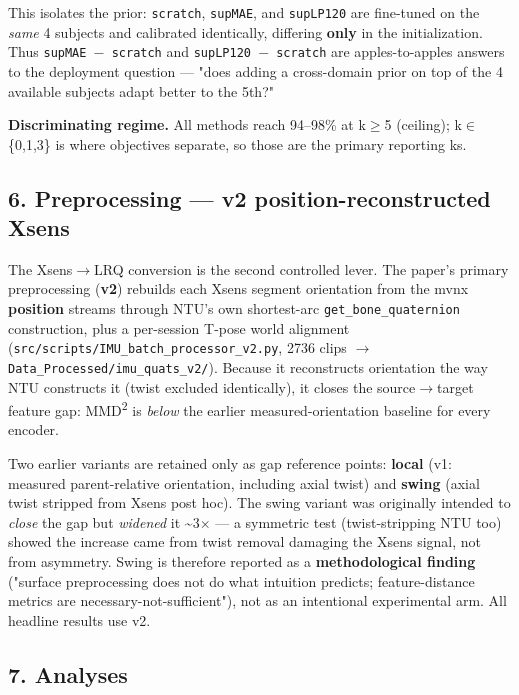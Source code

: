 This isolates the prior: \texttt{scratch}, \texttt{supMAE}, and \texttt{supLP120} are fine-tuned on the \textit{same} 4 subjects and calibrated identically, differing \textbf{only} in the initialization. Thus \texttt{supMAE $-$ scratch} and \texttt{supLP120 $-$ scratch} are apples-to-apples answers to the deployment question --- "does adding a cross-domain prior on top of the 4 available subjects adapt better to the 5th?"

\textbf{Discriminating regime.} All methods reach 94--98\% at k$\ge$5 (ceiling); k$\in$\{0,1,3\} is where objectives separate, so those are the primary reporting ks.

\subsection{6. Preprocessing --- v2 position-reconstructed Xsens}

The Xsens$\rightarrow$LRQ conversion is the second controlled lever. The paper's primary preprocessing (\textbf{v2}) rebuilds each Xsens segment orientation from the mvnx \textbf{position} streams through NTU's own shortest-arc \texttt{get\_bone\_quaternion} construction, plus a per-session T-pose world alignment (\texttt{src/scripts/IMU\_batch\_processor\_v2.py}, 2736 clips $\rightarrow$ \texttt{Data\_Processed/imu\_quats\_v2/}). Because it reconstructs orientation the way NTU constructs it (twist excluded identically), it closes the source$\rightarrow$target feature gap: MMD\textsuperscript{2} is \textit{below} the earlier measured-orientation baseline for every encoder.

Two earlier variants are retained only as gap reference points: \textbf{local} (v1: measured parent-relative orientation, including axial twist) and \textbf{swing} (axial twist stripped from Xsens post hoc). The swing variant was originally intended to \textit{close} the gap but \textit{widened} it \textasciitilde{}3$\times$ --- a symmetric test (twist-stripping NTU too) showed the increase came from twist removal damaging the Xsens signal, not from asymmetry. Swing is therefore reported as a \textbf{methodological finding} ("surface preprocessing does not do what intuition predicts; feature-distance metrics are necessary-not-sufficient"), not as an intentional experimental arm. All headline results use v2.

\subsection{7. Analyses}


